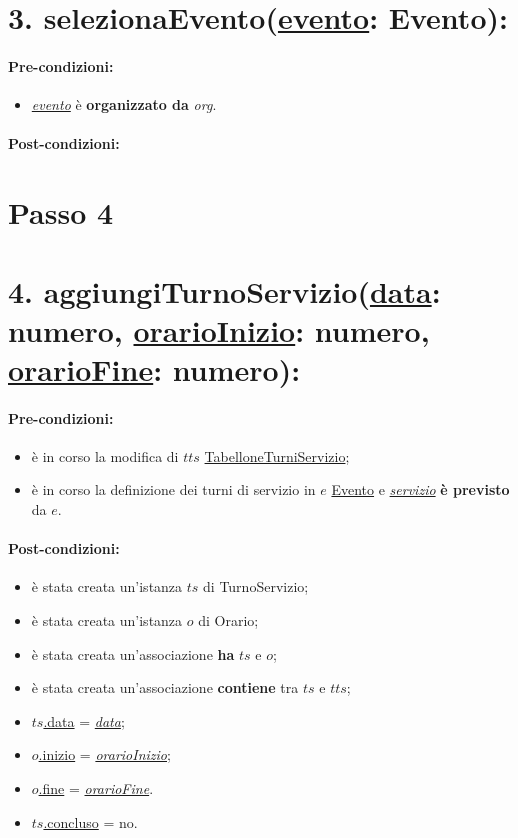 \section*{3. selezionaEvento(\underline{evento}: Evento):}

\paragraph{Pre-condizioni:}
\begin{itemize}
     \item \underline{\textit{evento}} è \textbf{organizzato da} \textit{org}.
\end{itemize}

\paragraph{Post-condizioni:}

\section{Passo 4}
\section*{4. aggiungiTurnoServizio(\underline{data}: numero, \underline{orarioInizio}: numero, \underline{orarioFine}: numero):}

\paragraph{Pre-condizioni:}
\begin{itemize}
    \item è in corso la modifica di $tts$ \underline{TabelloneTurniServizio};
    \item è in corso la definizione dei turni di servizio in $e$ \underline{Evento} e \underline{\textit{servizio}} \textbf{è previsto} da $e$.
\end{itemize}

\paragraph{Post-condizioni:}
\begin{itemize}
   \item è stata creata un'istanza $ts$ di TurnoServizio;
   \item è stata creata un'istanza $o$ di Orario;
   \item è stata creata un'associazione \textbf{ha} $ts$ e $o$;
    \item è stata creata un'associazione \textbf{contiene} tra $ts$ e $tts$;
   \item \underline{$ts$.data} = \underline{\textit{data}};
    \item \underline{$o$.inizio}  = \underline{\textit{orarioInizio}};
    \item \underline{$o$.fine}  = \underline{\textit{orarioFine}}.
    \item \underline{$ts$.concluso}  = no.
\end{itemize}



